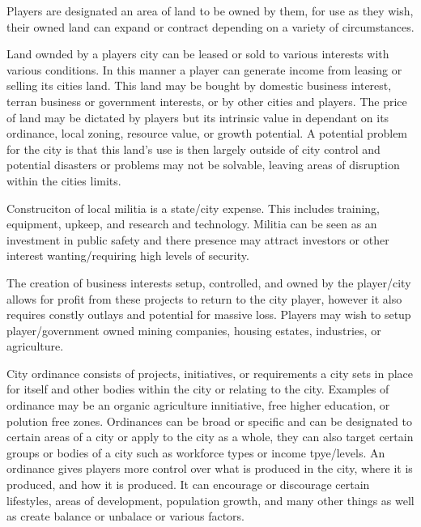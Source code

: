Players are designated an area of land to be owned by them, for use as they wish, their owned land can expand or contract depending on a variety of circumstances. 

Land ownded by a players city can be leased or sold to various interests with various conditions. In this manner a player can generate income from leasing or selling its cities land. This land may be bought by domestic business interest, terran business or government interests, or by other cities and players. The price of land may be dictated by players but its intrinsic value in dependant on its ordinance, local zoning, resource value, or growth potential. %
A potential problem for the city is that this land's use is then largely outside of city control and potential disasters or problems may not be solvable, leaving areas of disruption within the cities limits.



Construciton of local militia is a state/city expense. This includes training, equipment, upkeep, and research and technology. Militia can be seen as an investment in public safety and there presence may attract investors or other interest wanting/requiring high levels of security.




The creation of business interests setup, controlled, and owned by the player/city allows for profit from these projects to return to the city player, however it also requires constly outlays and potential for massive loss. Players may wish to setup player/government owned mining companies, housing estates, industries, or agriculture. 




City ordinance consists of projects, initiatives, or requirements a city sets in place for itself and other bodies within the city or relating to the city. Examples of ordinance may be an organic agriculture innitiative, free higher education, or polution free zones. Ordinances can be broad or specific and can be designated to certain areas of a city or apply to the city as a whole, they can also target certain groups or bodies of a city such as workforce types or income tpye/levels. An ordinance gives players more control over what is produced in the city, where it is produced, and how it is produced. It can encourage or discourage certain lifestyles, areas of development, population growth, and many other things as well as create balance or unbalace or various factors.

